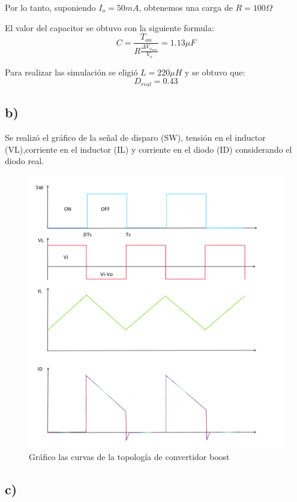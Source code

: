 \documentclass[e4_tp1_main.tex]{subfiles}
\begin{document}
Por lo tanto, suponiendo $I_o=50mA$, obtenemos una carga de $R=100\Omega$



El valor del capacitor se obtuvo con la siguiente formula:
$$C=\frac{T_{on}}{R\frac{\Delta V_{o_{max}}}{V_o}}=1.13\mu F$$

Para realizar las simulaci\'on se eligi\'o  $L=220\mu H$ y se obtuvo que: 
$$D_{real}=0.43$$

\subsection*{b)}

Se realiz\'o el gr\'afico de la señal de disparo (SW), tensión en el inductor (VL),corriente en el inductor (IL) y corriente en el diodo (ID) considerando el diodo real. 

\begin{figure}[H]
  \centering
    \includegraphics[scale = 0.7]{Imagenes/punto2/Dibujo}
  \caption{Gr\'afico las curvas de la topolog\'ia de convertidor boost}
  \label{fig:dibujo}
\end{figure}

\subsection*{c)}
\end{document}
